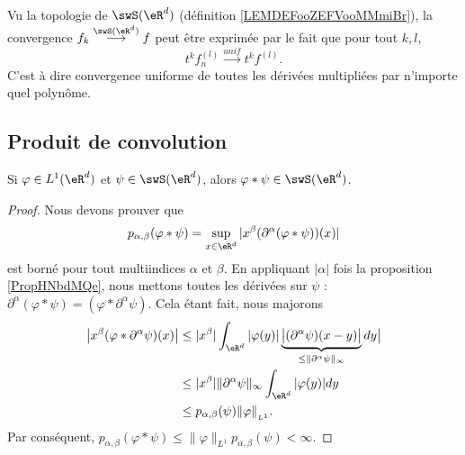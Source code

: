\begin{remark}
    Vu la topologie de \( \swS(\eR^d)\) (définition \ref{LEMDEFooZEFVooMMmiBr}), la convergence \( f_k\stackrel{\swS(\eR^d)}{\longrightarrow}f\) peut être exprimée par le fait que pour tout \( k,l\),
    \begin{equation}
        t^kf_n^{(l)}\stackrel{unif}{\longrightarrow}t^kf^{(l)}.
    \end{equation}
    C'est à dire convergence uniforme de toutes les dérivées multipliées par n'importe quel polynôme.
\end{remark}

\subsection{Produit de convolution}

\begin{proposition}     \label{PROPooUNFYooYdbSbJ}
    Si \( \varphi\in L^1(\eR^d)\) et \( \psi\in\swS(\eR^d)\), alors \( \varphi * \psi\in \swS(\eR^d)\).
\end{proposition}

\begin{proof}
    Nous devons prouver que
    \begin{equation}
        p_{\alpha,\beta}(\varphi*\psi)=\sup_{x\in \eR^d}| x^{\beta}(\partial^{\alpha}(\varphi*\psi))(x) |
    \end{equation}
    est borné pour tout multiindices \( \alpha\) et \( \beta\). En appliquant \( | \alpha |\) fois la proposition \ref{PropHNbdMQe}, nous mettons toutes les dérivées sur \( \psi\) : \( \partial^{\alpha}(\varphi*\psi)=(\varphi*\partial^{\alpha}\psi)\). Cela étant fait, nous majorons
    \begin{subequations}
        \begin{align}
            \big| x^{\beta}(\varphi*\partial^{\alpha}\psi)(x) \big|&\leq| x^{\beta} |\int_{\eR^d} |\varphi(y)|\underbrace{\big| (\partial^{\alpha}\psi)(x-y)\big|}_{\leq\| \partial^{\alpha}\psi \|_{\infty}} dy \big|\\
            &\leq | x^{\beta} |  \| \partial^{\alpha}\psi \|_{\infty}\int_{\eR^d}| \varphi(y) |dy\\
            &\leq p_{\alpha,\beta}(\psi)\| \varphi \|_{_{L^1}}.
        \end{align}
    \end{subequations}
    Par conséquent, \( p_{\alpha,\beta}(\varphi*\psi)\leq \| \varphi \|_{L^1}p_{\alpha,\beta}(\psi)<\infty\).
\end{proof}
